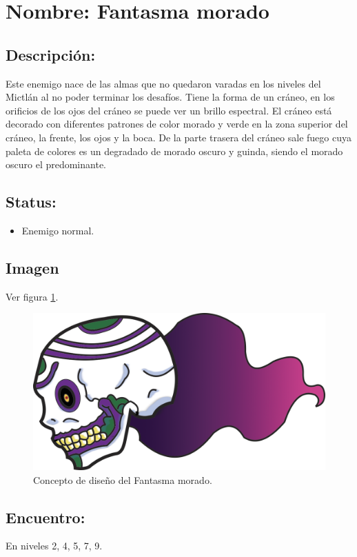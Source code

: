 \section{Nombre: Fantasma morado}   \label{per:fantasmaM}
\subsection{Descripción:}
Este enemigo nace de las almas que no quedaron varadas en los niveles del Mictlán al no poder terminar los desafíos. Tiene la forma de un cráneo, en los orificios de los ojos del cráneo se puede ver un brillo espectral. El cráneo está decorado con diferentes patrones de color morado y verde en la zona superior del cráneo, la frente, los ojos y la boca. De la parte trasera del cráneo sale fuego cuya paleta de colores es un degradado de morado oscuro y guinda, siendo el morado oscuro el predominante.  
\subsection{Status:}
\begin{itemize}
	\item Enemigo normal.
\end{itemize}
\subsection{Imagen}
Ver figura \ref{fig:fantasmaM}.
\begin{figure}
	\centering
	\includegraphics[height=0.2 \textheight]{Imagenes/fantasmaMorado}
	\caption{Concepto de diseño del Fantasma morado.}
	\label{fig:fantasmaM}
\end{figure}
\subsection{Encuentro:}
En niveles 2, 4, 5, 7, 9.
